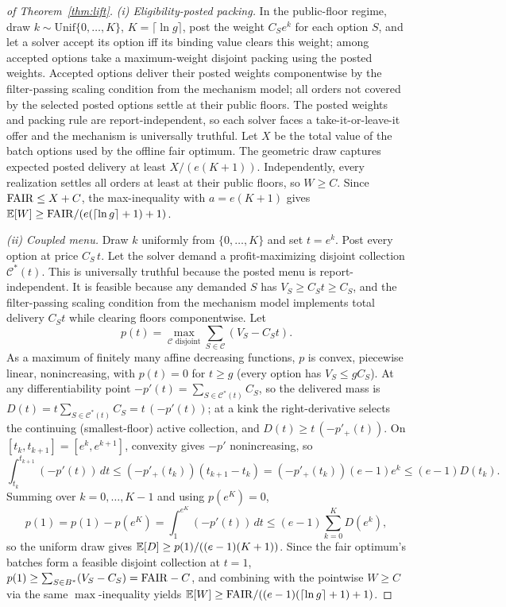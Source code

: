 \begin{proof}[of Theorem~\ref{thm:lift}]
\emph{(i) Eligibility-posted packing.} In the public-floor regime, draw
$k\sim\mathrm{Unif}\{0,\dots,K\}$, $K=\lceil\ln g\rceil$, post the weight
$C_S e^{k}$ for each option $S$, and let a solver accept its
option iff its binding value clears this weight; among accepted options
take a maximum-weight disjoint packing using the posted weights. Accepted
options deliver their posted weights componentwise by the filter-passing
scaling condition from the mechanism model; all orders not covered by the
selected posted options settle at their public floors. The
posted weights and packing rule are report-independent, so each solver
faces a take-it-or-leave-it offer and the mechanism is universally
truthful. Let
$X$ be the total value of the batch options used by the offline fair
optimum. The geometric draw captures expected posted delivery at least
$X/(e(K+1))$. Independently, every realization settles all orders at least
at their public floors, so $W\ge C$. Since $\mathrm{FAIR}\le X+C$, the
max-inequality with $a=e(K+1)$ gives
$\mathbb{E}[W]\ge\mathrm{FAIR}/(e(\lceil\ln g\rceil+1)+1)$.

\emph{(ii) Coupled menu.} Draw $k$ uniformly from $\{0,\ldots,K\}$ and
set $t=e^k$. Post every option at price $C_S\,t$. Let the solver demand a
profit-maximizing disjoint collection $\mathcal C^\ast(t)$. This is
universally truthful because the posted menu is report-independent. It is
feasible because any demanded $S$ has $V_S\ge C_St\ge C_S$, and the
filter-passing scaling condition from the mechanism model implements total
delivery $C_St$ while clearing floors componentwise. Let
\[
p(t)=
\max_{\mathcal C\text{ disjoint}}
\sum_{S\in\mathcal C}(V_S-C_St).
\]
As a maximum of finitely many affine decreasing functions, $p$ is convex,
piecewise linear, nonincreasing, with $p(t)=0$ for $t\ge g$ (every
option has $V_S\le gC_S$). At any differentiability point
$-p'(t)=\sum_{S\in\mathcal C^\ast(t)}C_S$, so the delivered mass is
$D(t)=t\sum_{S\in\mathcal C^\ast(t)}C_S=t\,(-p'(t))$; at a kink the
right-derivative selects the continuing (smallest-floor) active
collection, and $D(t)\ge t\,(-p'_+(t))$. On $[t_k,t_{k+1}]=[e^k,e^{k+1}]$,
convexity gives $-p'$ nonincreasing, so
\[
\int_{t_k}^{t_{k+1}}(-p'(t))\,dt\le (-p'_+(t_k))(t_{k+1}-t_k)
=(-p'_+(t_k))(e-1)e^k\le (e-1)D(t_k).
\]
Summing over $k=0,\dots,K-1$ and using $p(e^K)=0$,
\[
p(1)=p(1)-p(e^K)=\int_1^{e^K}(-p'(t))\,dt\le(e-1)\sum_{k=0}^{K}D(e^k),
\]
so the uniform draw gives $\mathbb{E}[D]\ge p(1)/((e-1)(K+1))$. Since the fair
optimum's batches form a feasible disjoint collection at $t=1$,
$p(1)\ge\sum_{S\in B^\ast}(V_S-C_S)=\mathrm{FAIR}-C$, and combining with the
pointwise $W\ge C$ via the same $\max$-inequality yields
$\mathbb{E}[W]\ge\mathrm{FAIR}/((e-1)(\lceil\ln g\rceil+1)+1)$.


\end{proof}
